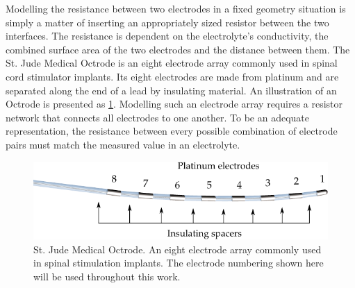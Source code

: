     Modelling the resistance between two electrodes in a fixed geometry situation is simply a matter of inserting an appropriately sized resistor between the two interfaces.
    The resistance is dependent on the electrolyte's conductivity, the combined surface area of the two electrodes and the distance between them.
    The St. Jude Medical Octrode is an eight electrode array commonly used in spinal cord stimulator implants.
    Its eight electrodes are made from platinum and are separated along the end of a lead by insulating material.
    An illustration of an Octrode is presented as \cref{fig:StJudeOctrode_Labelled}.
    Modelling such an electrode array requires a resistor network that connects all electrodes to one another.
    To be an adequate representation, the resistance between every possible combination of electrode pairs must match the measured value in an electrolyte.

    \begin{figure}
      \centering
      \includegraphics{content/pt2/07-InterfaceModel/graphics/StJudeOctrodeDiagram}
      \caption{\label{fig:StJudeOctrode_Labelled}St. Jude Medical Octrode. An eight electrode array commonly used in spinal stimulation implants. The electrode numbering shown here will be used throughout this work.}
    \end{figure}

